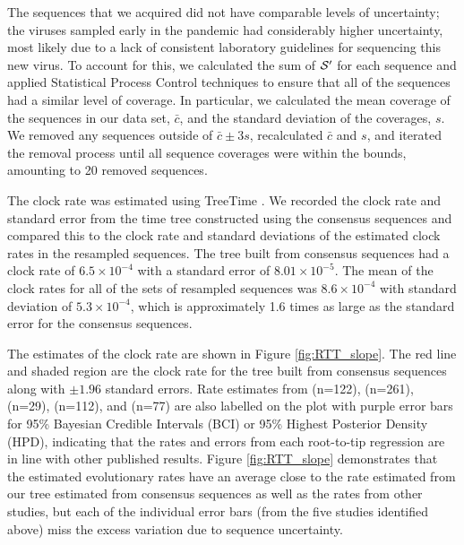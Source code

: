 \documentclass[12pt]{article}
\begin{document}
The sequences that we acquired did not have comparable levels of uncertainty; the viruses sampled early in the pandemic had considerably higher uncertainty, most likely due to a lack of consistent laboratory guidelines for sequencing this new virus.
To account for this, we calculated the sum of $\mathcal{S}'$ for each sequence and applied Statistical Process Control techniques to ensure that all of the sequences had a similar level of coverage.
In particular, we calculated the mean coverage of the sequences in our data set, $\bar c$, and the standard deviation of the coverages, $s$.
We removed any sequences outside of $\bar c \pm 3 s$, recalculated $\bar c$ and $s$, and iterated the removal process until all sequence coverages were within the bounds, amounting to 20 removed sequences.


The clock rate was estimated using TreeTime \cite{sagulenkoTreeTimeMaximumlikelihoodPhylodynamic2018}.
We recorded the clock rate and standard error from the time tree constructed using the consensus sequences and compared this to the clock rate and standard deviations of the estimated clock rates in the resampled sequences.
The tree built from consensus sequences had a clock rate of $6.5\times 10^{-4}$ with a standard error of $8.01\times 10^{-5}$.
The mean of the clock rates for all of the sets of resampled sequences was $8.6\times 10^{-4}$ with standard deviation of $5.3\times 10^{-4}$, which is approximately 1.6 times as large as the standard error for the consensus sequences.


The estimates of the clock rate are shown in Figure \ref{fig:RTT_slope}.
The red line and shaded region are the clock rate for the tree built from consensus sequences along with $\pm 1.96$ standard errors.
Rate estimates from \cite{ducheneTemporalSignalPhylodynamic2020} (n=122), \cite{choudharySevereAcuteRespiratory2021} (n=261), \cite{songGenomicEpidemiologySARSCoV22021} (n=29), \cite{niePhylogeneticPhylodynamicAnalyses2020} (n=112), and \cite{geidelbergGenomicEpidemiologyDensely2021} (n=77) are also labelled on the plot with purple error bars for 95\% Bayesian Credible Intervals (BCI) or 95\% Highest Posterior Density (HPD), indicating that the rates and errors from each root-to-tip regression are in line with other published results.
Figure \ref{fig:RTT_slope} demonstrates that the estimated evolutionary rates have an average close to the rate estimated from our tree estimated from consensus sequences as well as the rates from other studies, but each of the individual error bars (from the five studies identified above) miss the excess variation due to sequence uncertainty.
\end{document}
